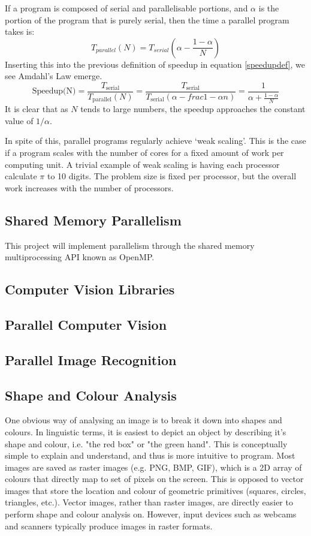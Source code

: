 \documentclass[../main.tex]{subfiles}
\begin{document}
    If a program is composed of serial and parallelisable portions, and $\alpha$ is the portion of the program that is purely serial, then the time a parallel program takes is:
    \begin{equation}
      T_{parallel}(N) = T_{serial}\left(\alpha-\frac{1-\alpha}{N}\right)
    \end{equation}
    Inserting this into the previous definition of speedup in equation \ref{speedupdef}, we see Amdahl's Law emerge.
    \begin{equation}
      \text{Speedup(N)} = \frac{T_\text{serial}}{T_\text{parallel}(N)} = \frac{T_\text{serial}}{T_\text{serial}\left(\alpha-frac{1-\alpha}{n}\right)} = \frac{1}{\alpha+\frac{1-\alpha}{N}}
      \label{amdahl}
    \end{equation}
    It is clear that as $N$ tends to large numbers, the speedup approaches the constant value of $1/\alpha$.  
    
    In spite of this, parallel programs regularly achieve `weak scaling'.
    This is the case if a program scales with the number of cores for a fixed amount of work per computing unit.
    A trivial example of weak scaling is having each processor calculate $\pi$ to 10 digits.
    The problem size is fixed per processor, but the overall work increases with the number of processors.
    \subsection{Shared Memory Parallelism}
      This project will implement parallelism through the shared memory multiprocessing API known as OpenMP.
    \subsection{Computer Vision Libraries}
    \subsection{Parallel Computer Vision}
    \subsection{Parallel Image Recognition}
    \subsection{Shape and Colour Analysis}
    One obvious way of analysing an image is to break it down into shapes and colours.
    In linguistic terms, it is easiest to depict an object by describing it's shape and colour, i.e. "the red box" or "the green hand".
    This is conceptually simple to explain and understand, and thus is more intuitive to program.
    Most images are saved as raster images (e.g. PNG, BMP, GIF), which is a 2D array of colours that directly map to set of pixels on the screen.
    This is opposed to vector images that store the location and colour of geometric primitives (squares, circles, triangles, etc.).
    Vector images, rather than raster images, are directly easier to perform shape and colour analysis on.
    However, input devices such as webcams and scanners typically produce images in raster formats.
\end{document}
